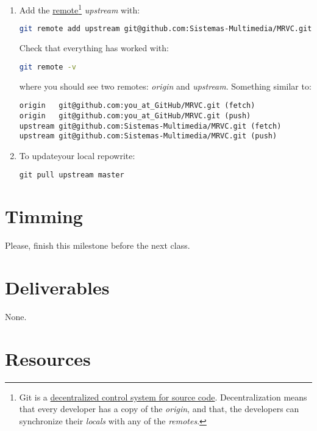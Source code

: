 \begin{enumerate}
\item Add the
  \href{https://docs.github.com/en/github/getting-started-with-github/github-glossary#remote}{remote}\footnote{Git
  is a
  \href{https://nvie.com/posts/a-successful-git-branching-model/}{decentralized
    control system for source code}. Decentralization means that every
  developer has a copy of the \emph{origin}, and that, the developers
  can synchronize their \emph{locals} with any of the \emph{remotes}.}
  \emph{upstream} with:

  \begin{lstlisting}[language=bash]
    git remote add upstream git@github.com:Sistemas-Multimedia/MRVC.git
  \end{lstlisting}

  Check that everything has worked with:

  \begin{lstlisting}[language=bash]  
    git remote -v
  \end{lstlisting}

  where you should see two remotes: \emph{origin} and \emph{upstream}. Something similar to:

\begin{verbatim}
origin   git@github.com:you_at_GitHub/MRVC.git (fetch)
origin   git@github.com:you_at_GitHub/MRVC.git (push)
upstream git@github.com:Sistemas-Multimedia/MRVC.git (fetch)
upstream git@github.com:Sistemas-Multimedia/MRVC.git (push)
\end{verbatim}

\item To updateyour local repowrite:

\begin{verbatim}
git pull upstream master
\end{verbatim}

\end{enumerate}

\section{Timming}

Please, finish this milestone before the next class.

\section{Deliverables}

None.

\section{Resources}

\renewcommand{\addcontentsline}[3]{}%


